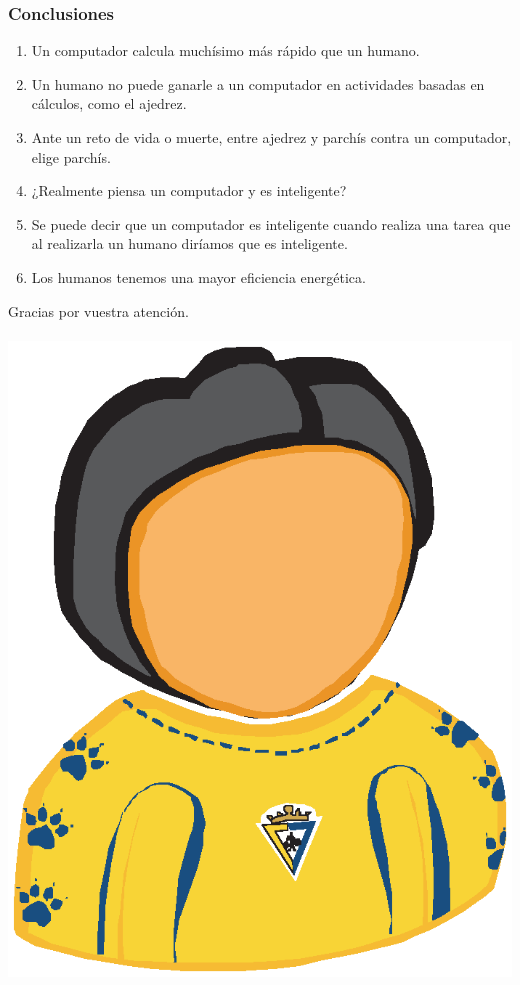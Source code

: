 \documentclass[a4paper,t,xcolor=pst,dvips,colortheme]{beamer}
\begin{document}
\begin{frame}[c]
    \frametitle{Conclusiones}
    \begin{enumerate}[<+->]
        \item Un computador calcula muchísimo más rápido que un humano.
        \item Un humano no puede ganarle a un computador en actividades basadas en cálculos, como el ajedrez.
        \item Ante un reto de vida o muerte, entre ajedrez y parchís contra un computador, elige parchís.
        \item ¿Realmente piensa un computador y es inteligente?
        \item Se puede decir que un computador es inteligente cuando realiza una tarea que al realizarla un humano diríamos que es inteligente.
        \item Los humanos tenemos una mayor eficiencia energética.
    \end{enumerate}
\end{frame}

\begin{frame}[c]
    \begin{center}
        \Huge{Gracias por vuestra atención.} \\ \ \\
        \includegraphics[width=0.20\linewidth]{images/tioDelCadiz.eps}
    \end{center}
\end{frame}
\end{document}
